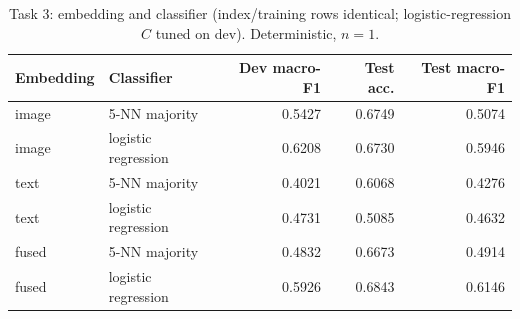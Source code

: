 \begin{table}[t]
\centering
\footnotesize
\caption{Task 3: embedding and classifier (index/training rows identical; logistic-regression $C$ tuned on dev). Deterministic, $n=1$.}
\label{tab:t3_emb}
\begin{tabular}{llrrr}
\toprule
Embedding & Classifier & Dev macro-F1 & Test acc. & Test macro-F1 \\
\midrule
image & 5-NN majority & 0.5427 & 0.6749 & 0.5074 \\
image & logistic regression & 0.6208 & 0.6730 & 0.5946 \\
text & 5-NN majority & 0.4021 & 0.6068 & 0.4276 \\
text & logistic regression & 0.4731 & 0.5085 & 0.4632 \\
fused & 5-NN majority & 0.4832 & 0.6673 & 0.4914 \\
fused & logistic regression & 0.5926 & 0.6843 & 0.6146 \\
\bottomrule
\end{tabular}
\end{table}

